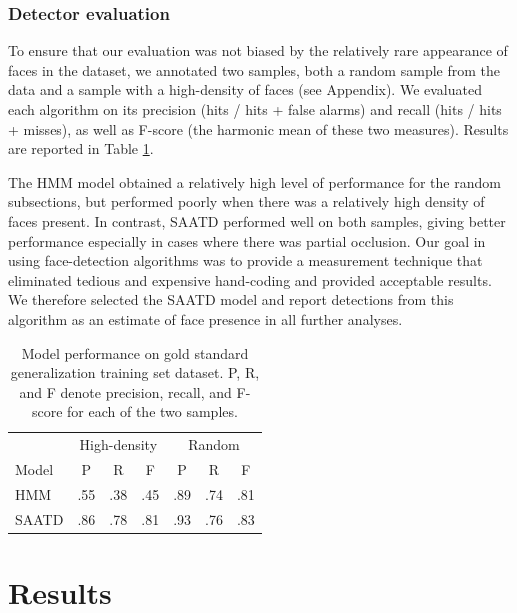 \documentclass[man,noapacite]{apa2}
\begin{document}
\subsubsection{Detector evaluation}

To ensure that our evaluation was not biased by the relatively rare appearance of faces in the dataset, we annotated two samples, both a random sample from the data and a sample with a high-density of faces (see Appendix). We evaluated each algorithm on its precision (hits / hits + false alarms) and recall (hits / hits + misses), as well as F-score (the harmonic mean of these two measures). Results are reported in Table \ref{tab:results}. 

The HMM model obtained a relatively high level of performance for the random subsections, but performed poorly when there was a relatively high density of faces present. In contrast, SAATD performed well on both samples, giving better performance especially in cases where there was partial occlusion. Our goal in using face-detection algorithms was to provide a measurement technique that eliminated tedious and expensive hand-coding and provided acceptable results. We therefore selected the SAATD model and report detections from this algorithm as an estimate of face presence in all further analyses. 

\begin{table}[t]
  \caption{Model performance on gold standard generalization training set dataset. P, R, and F denote precision, recall, and F-score for each of the two samples. \label{tab:results} } 
  \begin{center} 
    \begin{tabular}{l|ccc|ccc} 
      \hline
       &  \multicolumn{3}{c|}{High-density} &  \multicolumn{3}{c}{Random} \\
      \null Model & P & R & F & P & R & F  \\ 
      \hline 
      HMM &.55  & .38 &  .45 & .89 & .74 & .81   \\
      SAATD & .86 & .78 & .81 & .93 & .76 & .83 \\      
    \hline 
    \end{tabular} 
  \end{center}
\end{table}



\section{Results}
\end{document}
